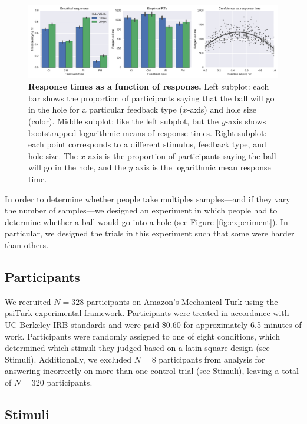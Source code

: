 \documentclass[10pt,letterpaper]{article}
\begin{document}
\begin{figure}[t]
    \begin{center}
        \includegraphics[width=\textwidth]{figures/hole_empirical_results.pdf}
        \caption{\textbf{Response times as a function of response.} Left subplot: each bar shows the proportion of participants saying that the ball will go in the hole for a particular feedback type ($x$-axis) and hole size (color). Middle subplot: like the left subplot, but the $y$-axis shows bootstrapped logarithmic means of response times. Right subplot: each point corresponds to a different stimulus, feedback type, and hole size.  The $x$-axis is the proportion of participants saying the ball will go in the hole, and the $y$ axis is the logarithmic mean response time.}
        \label{fig:pct-vs-rt}
    \end{center}
\end{figure}

In order to determine whether people take multiples samples---and if they vary the number of samples---we designed an experiment in which people had to determine whether a ball would go into a hole (see Figure \ref{fig:experiment}). In particular, we designed the trials in this experiment such that some were harder than others.

\subsection{Participants}

We recruited $N=328$ participants on Amazon's Mechanical Turk using the psiTurk \cite{McDonnell12} experimental framework. Participants were treated in accordance with UC Berkeley IRB standards and were paid \$0.60 for approximately 6.5 minutes of work. Participants were randomly assigned to one of eight conditions, which determined which stimuli they judged based on a latin-square design (see Stimuli). Additionally, we excluded $N=8$ participants from analysis for answering incorrectly on more than one control trial (see Stimuli), leaving a total of $N=320$ participants.

\subsection{Stimuli}
\end{document}
